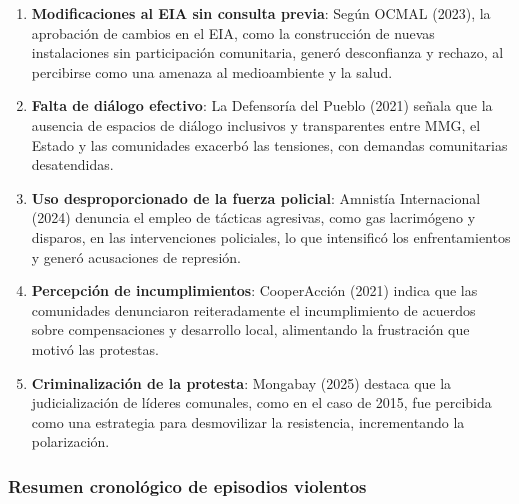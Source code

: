 \documentclass[
  stu,
  floatsintext,
  longtable,
  a4paper,
  nolmodern,
  notxfonts,
  notimes,
  colorlinks=true,linkcolor=blue,citecolor=blue,urlcolor=blue]{apa7}
\providecommand{\tightlist}{%
  \setlength{\itemsep}{0pt}\setlength{\parskip}{0pt}}
\begin{document}
\begin{enumerate}
\def\labelenumi{\arabic{enumi}.}
\tightlist
\item
  \textbf{Modificaciones al EIA sin consulta previa}: Según OCMAL
  (2023), la aprobación de cambios en el EIA, como la construcción de
  nuevas instalaciones sin participación comunitaria, generó
  desconfianza y rechazo, al percibirse como una amenaza al
  medioambiente y la salud.
\item
  \textbf{Falta de diálogo efectivo}: La Defensoría del Pueblo (2021)
  señala que la ausencia de espacios de diálogo inclusivos y
  transparentes entre MMG, el Estado y las comunidades exacerbó las
  tensiones, con demandas comunitarias desatendidas.
\item
  \textbf{Uso desproporcionado de la fuerza policial}: Amnistía
  Internacional (2024) denuncia el empleo de tácticas agresivas, como
  gas lacrimógeno y disparos, en las intervenciones policiales, lo que
  intensificó los enfrentamientos y generó acusaciones de represión.
\item
  \textbf{Percepción de incumplimientos}: CooperAcción (2021) indica que
  las comunidades denunciaron reiteradamente el incumplimiento de
  acuerdos sobre compensaciones y desarrollo local, alimentando la
  frustración que motivó las protestas.
\item
  \textbf{Criminalización de la protesta}: Mongabay (2025) destaca que
  la judicialización de líderes comunales, como en el caso de 2015, fue
  percibida como una estrategia para desmovilizar la resistencia,
  incrementando la polarización.
\end{enumerate}

\subsubsection{Resumen cronológico de episodios
violentos}\label{resumen-cronoluxf3gico-de-episodios-violentos}
\end{document}
